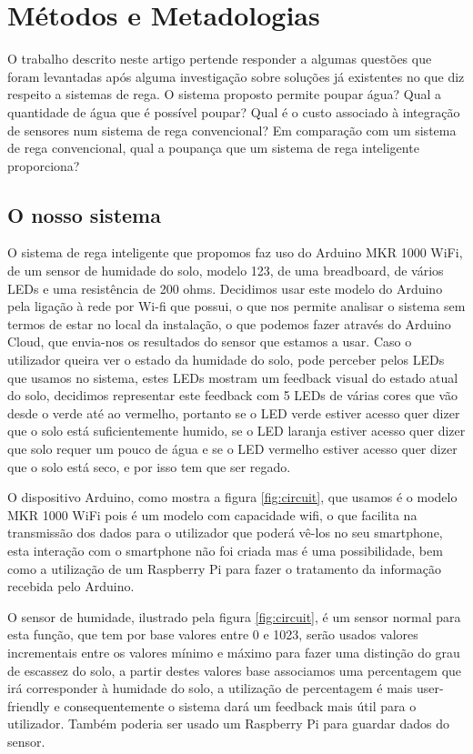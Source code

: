 \documentclass[conference]{IEEEtran}
\begin{document}
\section{Métodos e Metadologias}

O trabalho descrito neste artigo pertende responder a algumas questões que foram 
levantadas após alguma investigação sobre soluções já existentes no que diz respeito 
a sistemas de rega. O sistema proposto permite poupar água? Qual a quantidade de água 
que é possível poupar?  Qual é o custo associado à integração de sensores num sistema 
de rega convencional? Em comparação com um sistema de rega convencional, 
qual a poupança que um sistema de rega inteligente proporciona?

\subsection{O nosso sistema}

O sistema de rega inteligente que propomos faz uso do Arduino MKR 1000 WiFi, 
de um sensor de humidade do solo, modelo 123, de uma breadboard, de vários LEDs 
e uma resistência de 200 ohms. Decidimos usar este modelo do Arduino pela ligação 
à rede por Wi-fi que possui, o que nos permite analisar o sistema sem termos de 
estar no local da instalação, o que podemos fazer através do Arduino Cloud, 
que envia-nos os resultados do sensor que estamos a usar. Caso o utilizador 
queira ver o estado da humidade do solo, pode perceber pelos LEDs que usamos no sistema, 
estes LEDs mostram um feedback visual do estado atual do solo, decidimos representar este 
feedback com 5 LEDs de várias cores que vão desde o verde até ao vermelho, portanto 
se o LED verde estiver acesso quer dizer que o solo está suficientemente humido, se 
o LED laranja estiver acesso quer dizer que solo requer um pouco de água e se o LED
vermelho estiver acesso quer dizer que o solo está seco, e por isso tem que ser regado.

O dispositivo Arduino, como mostra a figura \ref{fig:circuit}, que usamos é o 
modelo MKR 1000 WiFi pois é um modelo com capacidade wifi, o que facilita na 
transmissão dos dados para o utilizador que poderá vê-los no seu smartphone, 
esta interação com o smartphone não foi criada mas é uma possibilidade, bem 
como a utilização de um Raspberry Pi para fazer o tratamento da informação 
recebida pelo Arduino.

O sensor de humidade, ilustrado pela figura \ref{fig:circuit}, é um 
sensor normal para esta função, que tem por base valores entre 0 e 1023, serão usados valores 
incrementais entre os valores mínimo e máximo para fazer uma distinção do grau 
de escassez do solo, a partir destes valores base associamos uma percentagem 
que irá corresponder à humidade do solo, a utilização de percentagem é 
mais user-friendly e consequentemente o sistema dará um feedback mais útil
para o utilizador. Também poderia ser usado um Raspberry Pi para guardar dados do sensor.
\end{document}
